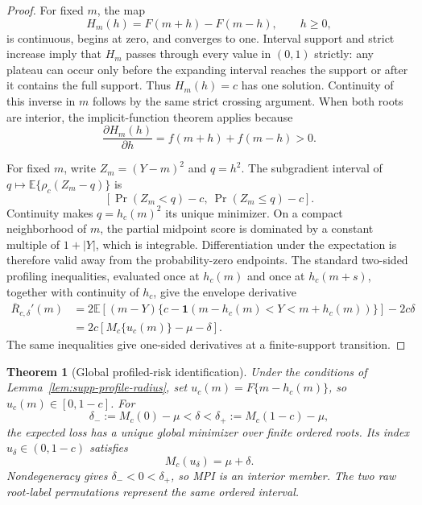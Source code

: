 \documentclass[11pt]{article}
\newcommand{\E}{\mathbb{E}}
\newcommand{\ind}{\mathbf{1}}
\newtheorem{theorem}{Theorem}
\begin{document}
\begin{proof}
For fixed \(m\), the map
\[
H_m(h)=F(m+h)-F(m-h),\qquad h\ge0,
\]
is continuous, begins at zero, and converges to one. Interval support and
strict increase imply that \(H_m\) passes through every value in \((0,1)\)
strictly: any plateau can occur only before the expanding interval reaches
the support or after it contains the full support. Thus \(H_m(h)=c\) has one
solution. Continuity of this inverse in \(m\) follows by the same strict
crossing argument. When both roots are interior, the implicit-function
theorem applies because
\[
\frac{\partial H_m(h)}{\partial h}
=f(m+h)+f(m-h)>0.
\]

For fixed \(m\), write \(Z_m=(Y-m)^2\) and \(q=h^2\). The subgradient interval
of \(q\mapsto\E\{\rho_c(Z_m-q)\}\) is
\[
\left[\Pr(Z_m<q)-c,\ \Pr(Z_m\le q)-c\right].
\]
Continuity makes \(q=h_c(m)^2\) its unique minimizer. On a compact
neighborhood of \(m\), the partial midpoint score is dominated by a constant
multiple of \(1+|Y|\), which is integrable. Differentiation under the
expectation is therefore valid away from the probability-zero endpoints.
The standard two-sided profiling inequalities, evaluated once at
\(h_c(m)\) and once at \(h_c(m+s)\), together with continuity of \(h_c\),
give the envelope derivative
\begin{align*}
\overline R_{c,\delta}'(m)
&=
2\E\!\left[(m-Y)
\{c-\ind(m-h_c(m)<Y<m+h_c(m))\}\right]-2c\delta\\
&=
2c\left[M_c\{u_c(m)\}-\mu-\delta\right].
\end{align*}
The same inequalities give one-sided derivatives at a finite-support
transition.
\end{proof}

\begin{theorem}[Global profiled-risk identification]
\label{thm:supp-profiled-risk}
Under the conditions of Lemma~\ref{lem:supp-profile-radius}, set
\(u_c(m)=F\{m-h_c(m)\}\), so \(u_c(m)\in[0,1-c]\). For
\[
\delta_-:=M_c(0)-\mu<\delta<
\delta_+:=M_c(1-c)-\mu,
\]
the expected loss has a unique global minimizer over finite ordered roots. Its
index \(u_\delta\in(0,1-c)\) satisfies
\[
M_c(u_\delta)=\mu+\delta.
\]
Nondegeneracy gives \(\delta_-<0<\delta_+\), so MPI is an interior
member. The two raw root-label permutations represent the same ordered
interval.
\end{theorem}
\end{document}
